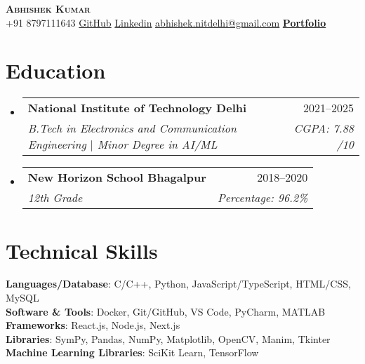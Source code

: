 \documentclass[a4paper, 10.75pt]{article}
\makeatletter
\newcommand{\resumeSubheading}[4]{
  \vspace{-2pt}\item
    \begin{tabular*}{0.97\textwidth}[t]{l@{\extracolsep{\fill}}r}
      \textbf{#1} & #2 \\
      \textit{\small#3} & \textit{\small #4} \\
    \end{tabular*}\vspace{-8pt}
}
\newcommand{\resumeSubHeadingListStart}{\begin{itemize}[leftmargin=0.15in, label={}]}
\newcommand{\resumeSubHeadingListEnd}{\end{itemize}}
\makeatother
\begin{document}

\vspace{-5pt}

\begin{center}
    \textbf{\Huge \scshape Abhishek Kumar} \\ \vspace{8pt}
    \small 
    \faPhone{} {+91 8797111643} \hspace{12pt} %
    \href{https://github.com/abhiphile}{GitHub} \hspace{12pt} %
    \href{https://www.linkedin.com/in/abhishek-kumar-nitdelhi/}{Linkedin} \hspace{12pt} %
    \href{mailto:abhishek.nitdelhi@gmail.com}
    {\underline{abhishek.nitdelhi@gmail.com}} \hspace{12pt} %
    \href{https://abhishek-portfolio-chi.vercel.app/}{\textbf{Portfolio}}
\end{center}



\section{Education}
\resumeSubHeadingListStart

\resumeSubheading
{National Institute of Technology Delhi}{2021--2025}
{B.Tech in Electronics and Communication Engineering
$|$ Minor Degree in AI/ML}{CGPA: 7.88 /10}

\resumeSubheading
{New Horizon School Bhagalpur}{2018--2020}
{12th Grade}{Percentage: 96.2\%}

\resumeSubHeadingListEnd


\section{Technical Skills}
 \begin{itemize}[leftmargin=0.15in, label={}]
    \small{\item{
    
     \textbf{Languages/Database}{: C/C++, Python, JavaScript/TypeScript, HTML/CSS, MySQL} \\
     \textbf{Software \& Tools}{: Docker, Git/GitHub, VS Code, PyCharm, MATLAB}\\
      \textbf{Frameworks}{: React.js, Node.js, Next.js} \\
      \textbf{Libraries}{: SymPy, Pandas, NumPy, Matplotlib, OpenCV, Manim, Tkinter }\\
     \textbf{Machine Learning Libraries}{: SciKit Learn, TensorFlow}
    }}
 \end{itemize}
\end{document}
